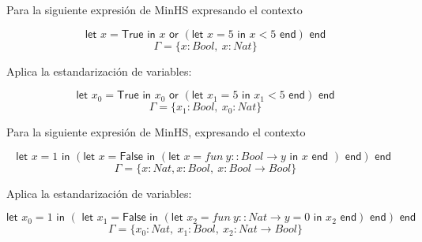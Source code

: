 \begin{exercise}    
    Para la siguiente expresión de \textsf{MinHS} expresando el contexto

    $$ \textsf{let } x = \textsf{True} \textsf{ in } x \textsf{ or } (\textsf{let } x = 5 \textsf{ in } x < 5 \textsf{ end}) \textsf{ end} $$
    $$ \Gamma = \{x:Bool,\ x:Nat\}$$
    
    Aplica la estandarización de variables: 
    
    $$ \textsf{let } x_0 = \textsf{True} \textsf{ in } x_0 \textsf{ or } (\textsf{let } x_1 = 5 \textsf{ in } x_1 < 5 \textsf{ end}) \textsf{ end} $$
    $$ \Gamma = \{x_1:Bool,\ x_0:Nat\}$$
\end{exercise}

\begin{exercise}    
    Para la siguiente expresión de \textsf{MinHS}, expresando el contexto
    
    $$ \textsf{let } x = 1 \textsf{ in } (\textsf{let } x = \textsf{False} \textsf{ in } (\textsf{let } x = fun\ y :: Bool \to y  \textsf{ in } x \textsf{ end }) \textsf{ end}) \textsf{ end }$$
    $$ \Gamma = \{ x : Nat, x : Bool,\ x : Bool \to Bool \}$$
    
    Aplica la estandarización de variables:
    
    $$ \textsf{let } x_0 = 1 \textsf{ in } (\textsf{ let } x_1 = \textsf{False} \textsf{ in } (\textsf{let } x_2 = fun\ y :: Nat \to y = 0  \textsf{ in } x_2 \textsf{ end}) \textsf{ end}) \textsf{ end} $$
    $$ \Gamma = \{ x_0 : Nat,\ x_1 : Bool,\ x_2 : Nat \to Bool \}$$
\end{exercise}

